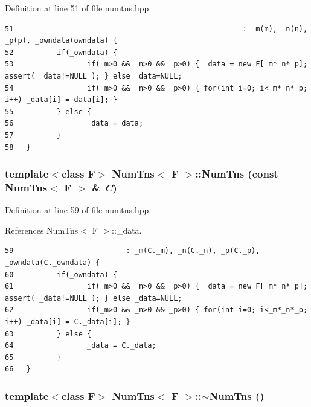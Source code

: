 Definition at line 51 of file numtns.hpp.

\footnotesize\begin{verbatim}51                                                     : _m(m), _n(n), _p(p), _owndata(owndata) {
52          if(_owndata) {
53                 if(_m>0 && _n>0 && _p>0) { _data = new F[_m*_n*_p]; assert( _data!=NULL ); } else _data=NULL;
54                 if(_m>0 && _n>0 && _p>0) { for(int i=0; i<_m*_n*_p; i++) _data[i] = data[i]; }
55          } else {
56                 _data = data;
57          }
58   }
\end{verbatim}\normalsize 


\subsubsection{\setlength{\rightskip}{0pt plus 5cm}template$<$class F$>$ {\bf Num\-Tns}$<$ F $>$::{\bf Num\-Tns} (const {\bf Num\-Tns}$<$ F $>$ \& {\em C})\hspace{0.3cm}{\tt  [inline]}}\label{classNumTns_6859e16784301dfe2c97eb9a23c26176_6859e16784301dfe2c97eb9a23c26176}




Definition at line 59 of file numtns.hpp.

References Num\-Tns$<$ F $>$::\_\-data.

\footnotesize\begin{verbatim}59                          : _m(C._m), _n(C._n), _p(C._p), _owndata(C._owndata) {
60          if(_owndata) {
61                 if(_m>0 && _n>0 && _p>0) { _data = new F[_m*_n*_p]; assert( _data!=NULL ); } else _data=NULL;
62                 if(_m>0 && _n>0 && _p>0) { for(int i=0; i<_m*_n*_p; i++) _data[i] = C._data[i]; }
63          } else {
64                 _data = C._data;
65          }
66   }
\end{verbatim}\normalsize 


\subsubsection{\setlength{\rightskip}{0pt plus 5cm}template$<$class F$>$ {\bf Num\-Tns}$<$ F $>$::$\sim${\bf Num\-Tns} ()\hspace{0.3cm}{\tt  [inline]}}\label{classNumTns_d979d3cf1a54b11f6fd51e02dc5911f4_d979d3cf1a54b11f6fd51e02dc5911f4}





